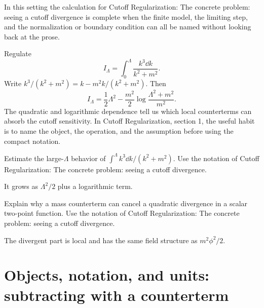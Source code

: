 In this setting the calculation for Cutoff Regularization: The concrete problem: seeing a cutoff divergence is complete when the finite model, the limiting step, and the normalization or boundary condition can all be named without looking back at the prose.




\begin{example}
Regulate
\[
  I_\Lambda=\int_0^\Lambda\frac{k^3\dd k}{k^2+m^2}.
\]
Write \(k^3/(k^2+m^2)=k-m^2k/(k^2+m^2)\).  Then
\[
  I_\Lambda=\frac12\Lambda^2-\frac{m^2}{2}\log\frac{\Lambda^2+m^2}{m^2}.
\]
The quadratic and logarithmic dependence tell us which local counterterms can absorb the cutoff sensitivity.  In Cutoff Regularization, section 1, the useful habit is to name the object, the operation, and the assumption before using the compact notation.
\end{example}



\begin{exercise}
Estimate the large-\(\Lambda\) behavior of \(\int^\Lambda k^3\dd k/(k^2+m^2)\).  Use the notation of Cutoff Regularization: The concrete problem: seeing a cutoff divergence.
\begin{answer}
It grows as \(\Lambda^2/2\) plus a logarithmic term.
\end{answer}
\end{exercise}

\begin{exercise}
Explain why a mass counterterm can cancel a quadratic divergence in a scalar two-point function.  Use the notation of Cutoff Regularization: The concrete problem: seeing a cutoff divergence.
\begin{answer}
The divergent part is local and has the same field structure as \(m^2\phi^2/2\).
\end{answer}
\end{exercise}



\section{Objects, notation, and units: subtracting with a counterterm}













